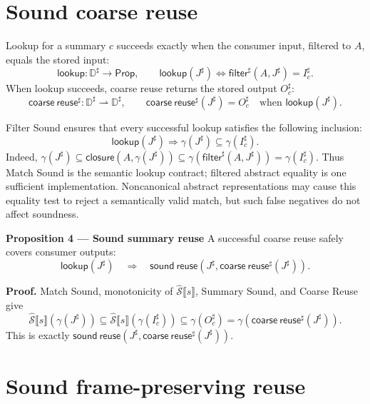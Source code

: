\documentclass[10pt]{article}
\newcommand{\boxheading}[1]{\textbf{#1}\quad}
\newcommand{\CollectingSemantics}[1]{\widehat{\mathcal S}\mathopen{⟦}#1\mathclose{⟧}}
\newcommand{\ProjClose}{\mathsf{closure}}
\newcommand{\filter}{\mathsf{filter}}
\newcommand{\reuse}{\mathsf{coarse\ reuse}}
\newcommand{\Lookup}{\mathsf{lookup}}
\newcommand{\SoundReuse}{\mathsf{sound\ reuse}}
\newcommand{\qedbox}{\hfill\raisebox{0.15ex}{\fboxsep=0pt\fbox{\rule{0pt}{0.55em}\rule{0.55em}{0pt}}}}
\begin{document}
\section{Sound coarse reuse}

Lookup for a summary \(c\) succeeds exactly when the consumer input, filtered to \(A\), equals
the stored input:
\[
  \Lookup:\mathbb D^\sharp\to\mathsf{Prop},
  \qquad
  \Lookup(J^\sharp)
  \Longleftrightarrow
  \filter^\sharp(A,J^\sharp)=I_c^\sharp.
\]
When lookup succeeds, coarse reuse returns the stored output \(O_c^\sharp\):
\[
  \reuse^\sharp:\mathbb D^\sharp\rightharpoonup\mathbb D^\sharp,
  \qquad
  \reuse^\sharp(J^\sharp)=O_c^\sharp
  \quad\text{when }\Lookup(J^\sharp).
  \tag{Coarse Reuse}
\]

Filter Sound ensures that every successful lookup satisfies the following inclusion:
\[
  \Lookup(J^\sharp)
  \Longrightarrow
  \gamma(J^\sharp)\subseteq\gamma(I_c^\sharp).
  \tag{Match Sound}
\]
Indeed, \(\gamma(J^\sharp)\subseteq
\ProjClose(A,\gamma(J^\sharp))\subseteq
\gamma(\filter^\sharp(A,J^\sharp))=\gamma(I_c^\sharp)\).
Thus Match Sound is the semantic lookup contract; filtered abstract equality is one sufficient
implementation. Noncanonical abstract representations may cause this equality test to reject a
semantically valid match, but such false negatives do not affect soundness.

\begin{statementbox}
\boxheading{Proposition 4 --- Sound summary reuse}
A successful coarse reuse safely covers consumer outputs:
\[
  \Lookup(J^\sharp)
  \quad\Longrightarrow\quad
  \SoundReuse\!\left(J^\sharp,\reuse^\sharp(J^\sharp)\right).
\]
\end{statementbox}

\textbf{Proof.}
Match Sound, monotonicity of \(\CollectingSemantics{s}\), Summary Sound, and Coarse Reuse give
\[
  \CollectingSemantics{s}\!\left(\gamma(J^\sharp)\right)
  \subseteq
  \CollectingSemantics{s}\!\left(\gamma(I_c^\sharp)\right)
  \subseteq\gamma(O_c^\sharp)
  =\gamma\!\left(\reuse^\sharp(J^\sharp)\right).
\]
This is exactly \(\SoundReuse(J^\sharp,\reuse^\sharp(J^\sharp))\). \qedbox

\section{Sound frame-preserving reuse}
\end{document}
